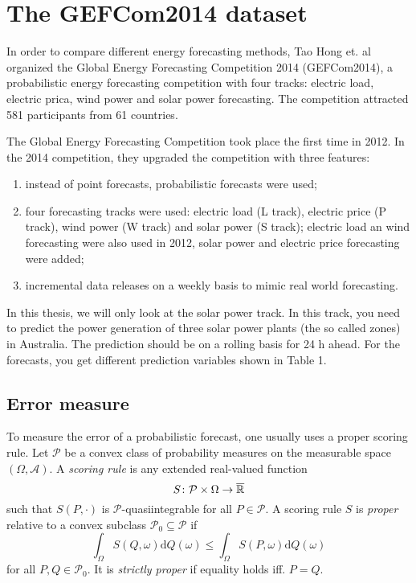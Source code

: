 \section{The GEFCom2014 dataset}

In order to compare different energy forecasting methods, 
Tao Hong et. al organized the Global Energy Forecasting Competition 2014 (GEFCom2014), 
a probabilistic energy forecasting competition with four tracks: 
electric load, electric prica, wind power and solar power forecasting. 
The competition attracted 581 participants from 61 countries. 

The Global Energy Forecasting Competition took place the first time in 2012. 
In the 2014 competition, they upgraded the competition with three features: 
\begin{enumerate}
    \item instead of point forecasts, probabilistic forecasts were used;
    \item four forecasting tracks were used: electric load (L track), 
    electric price (P track), wind power (W track) and solar power (S track);
    electric load an wind forecasting were also used in 2012, solar power and 
    electric price forecasting were added;
    \item incremental data releases on a weekly basis to mimic real world forecasting.
\end{enumerate}

In this thesis, we will only look at the solar power track. 
In this track, you need to predict the power generation of three 
solar power plants (the so called zones) in Australia. The prediction should be on a rolling 
basis for 24 h ahead. 
For the forecasts, you get different prediction variables shown in Table 1. 

\subsection{Error measure}

To measure the error of a probabilistic forecast, one usually uses a 
proper scoring rule. 
Let \(\mathcal{P}\) be a convex class of probability measures on the 
measurable space \((\Omega, \mathcal{A})\).
A \textit{scoring rule} is any extended real-valued function 
\[ S\colon \mathcal{P} \times \Omega \rightarrow \overline{\mathbb{R}} \]
such that \(S(P, \cdot)\) is \(\mathcal{P}\)-quasiintegrable for all 
\(P\in \mathcal{P}\).
A scoring rule \(S\) is \textit{proper} relative to a convex subclass 
\(\mathcal{P}_0 \subseteq \mathcal{P}\) if
\[ \int_\Omega S(Q, \omega) \mathrm{d}Q(\omega) \leq \int_\Omega S(P, \omega) \mathrm{d}Q(\omega) \]
for all \(P, Q \in \mathcal{P}_0\). It is \textit{strictly proper} 
if equality holds iff. \(P = Q\).

